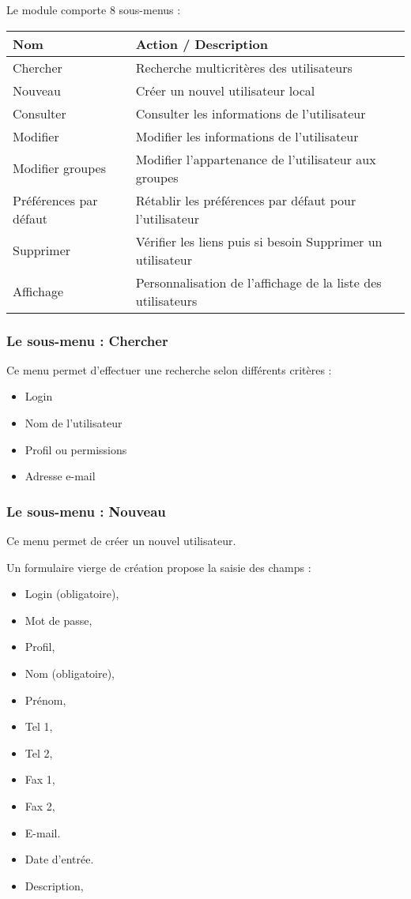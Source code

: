 Le module \user comporte 8 sous-menus :

\begin{tabular}{|p{3.5cm}|p{9.5cm}|}
\hline
\textbf{Nom} & \textbf{Action / Description} \\
\hline
Chercher & Recherche multicritères des utilisateurs \\
\hline
Nouveau & Créer un nouvel utilisateur local \\
\hline
Consulter & Consulter les informations de l'utilisateur \\
\hline
Modifier & Modifier les informations de l'utilisateur\\
\hline
Modifier groupes & Modifier l'appartenance de l'utilisateur aux groupes\\
\hline
Préférences par défaut & Rétablir les préférences par défaut pour l'utilisateur\\
\hline
Supprimer & Vérifier les liens puis si besoin Supprimer un utilisateur\\
\hline
Affichage & Personnalisation de l'affichage de la liste des utilisateurs\\
\hline
\end{tabular}


\subsubsection{Le sous-menu : Chercher}

Ce menu permet d'effectuer une recherche selon différents critères :

\begin{itemize}
\item Login
\item Nom de l'utilisateur
\item Profil ou permissions
\item Adresse e-mail
\end{itemize}


\subsubsection{Le sous-menu : Nouveau}

Ce menu permet de créer un nouvel utilisateur.

Un formulaire vierge de création propose la saisie des champs :

\begin{itemize}
\item Login (obligatoire),
\item Mot de passe,
\item Profil,
\item Nom (obligatoire),
\item Prénom,
\item Tel 1,
\item Tel 2,
\item Fax 1,
\item Fax 2,
\item E-mail.
\item Date d'entrée.
\item Description,
\end{itemize}


